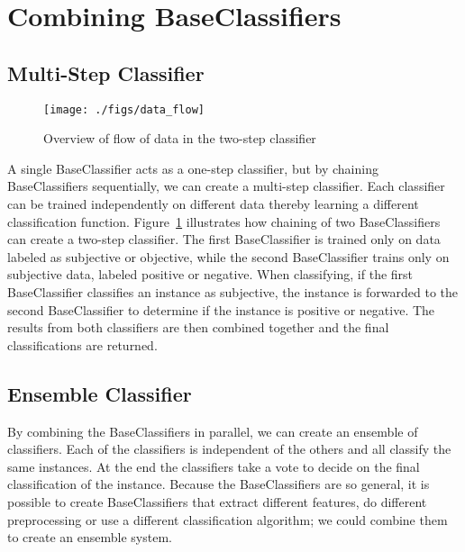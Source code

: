 \section{Combining BaseClassifiers}
\subsection{Multi-Step Classifier}
\label{sec:multi_step_classifier}

\begin{figure}[t]
    \begin{center}
        \texttt{[image: ./figs/data\_flow]}
    \end{center}
    \caption{Overview of flow of data in the two-step classifier}
    \label{fig:data_flow}
\end{figure}

A single BaseClassifier acts as a one-step classifier, but by chaining BaseClassifiers sequentially, we can create a multi-step classifier. Each classifier can be trained independently on different data thereby learning a different classification function. Figure~\ref{fig:data_flow} illustrates how chaining of two BaseClassifiers can create a two-step classifier. The first BaseClassifier is trained only on data labeled as subjective or objective, while the second BaseClassifier trains only on subjective data, labeled positive or negative. When classifying, if the first BaseClassifier classifies an instance as subjective, the instance is forwarded to the second BaseClassifier to determine if the instance is positive or negative. The results from both classifiers are then combined together and the final classifications are returned.

\subsection{Ensemble Classifier}
By combining the BaseClassifiers in parallel, we can create an ensemble of classifiers. Each of the classifiers is independent of the others and all classify the same instances. At the end the classifiers take a vote to decide on the final classification of the instance. Because the BaseClassifiers are so general, it is possible to create BaseClassifiers that extract different features, do different preprocessing or use a different classification algorithm; we could combine them to create an ensemble system. 


\glsresetall

